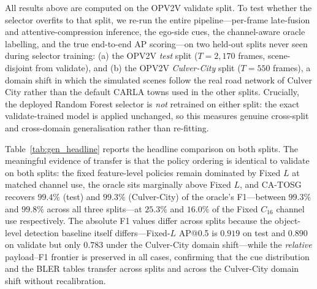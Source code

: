 \documentclass[journal]{IEEEtran}
\newcommand{\method}{CA-TOSG}
\begin{document}
All results above are computed on the OPV2V validate split. To test whether the selector overfits to that split, we re-run the entire pipeline---per-frame late-fusion and attentive-compression inference, the ego-side cues, the channel-aware oracle labelling, and the true end-to-end AP scoring---on two held-out splits never seen during selector training: (a) the OPV2V \emph{test} split ($T=2{,}170$ frames, scene-disjoint from validate), and (b) the OPV2V \emph{Culver-City} split ($T=550$ frames), a domain shift in which the simulated scenes follow the real road network of Culver City rather than the default CARLA towns used in the other splits. Crucially, the deployed Random Forest selector is \emph{not} retrained on either split: the exact validate-trained model is applied unchanged, so this measures genuine cross-split and cross-domain generalisation rather than re-fitting.

Table~\ref{tab:gen_headline} reports the headline comparison on both splits. The meaningful evidence of transfer is that the policy ordering is identical to validate on both splits: the fixed feature-level policies remain dominated by Fixed $L$ at matched channel use, the oracle sits marginally above Fixed $L$, and \method{} recovers $99.4\%$ (test) and $99.3\%$ (Culver-City) of the oracle's F1---between $99.3\%$ and $99.8\%$ across all three splits---at $25.3\%$ and $16.0\%$ of the Fixed $C_{16}$ channel use respectively. The absolute F1 values differ across splits because the object-level detection baseline itself differs---Fixed-$L$ AP@0.5 is $0.919$ on test and $0.890$ on validate but only $0.783$ under the Culver-City domain shift---while the \emph{relative} payload--F1 frontier is preserved in all cases, confirming that the cue distribution and the BLER tables transfer across splits and across the Culver-City domain shift without recalibration.
\end{document}
